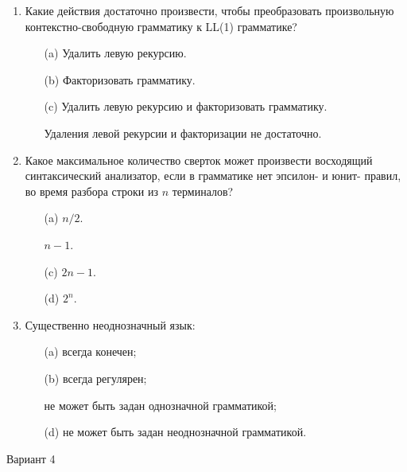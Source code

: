 \documentclass[12pt]{article}
\begin{document}
\begin{enumerate}
    \item Какие действия достаточно произвести, чтобы преобразовать произвольную контекстно-свободную грамматику к LL(1) грамматике?
    \begin{enumerate}
        \item[(a)] Удалить левую рекурсию.
        \item[(b)] Факторизовать грамматику.
        \item[(c)] Удалить левую рекурсию и факторизовать грамматику.
        \item[\Checkmark] Удаления левой рекурсии и факторизации не достаточно.
    \end{enumerate}
    
    \item Какое максимальное количество сверток может произвести восходящий синтаксический анализатор, если в грамматике нет эпсилон- и юнит- правил, во время разбора строки из $n$ терминалов?
    \begin{enumerate}
        \item[(a)] $n/2$.
        \item[\Checkmark] $n-1$.
        \item[(c)] $2n-1$.
        \item[(d)] $2^n$.
    \end{enumerate}
    
    \item Существенно неоднозначный язык:
    \begin{enumerate}
        \item[(a)] всегда конечен;
        \item[(b)] всегда регулярен;
        \item[\Checkmark] не может быть задан однозначной грамматикой;
        \item[(d)] не может быть задан  неоднозначной грамматикой.
    \end{enumerate}
\end{enumerate}


\medskip
{\Large Вариант 4}
\medskip
\end{document}
